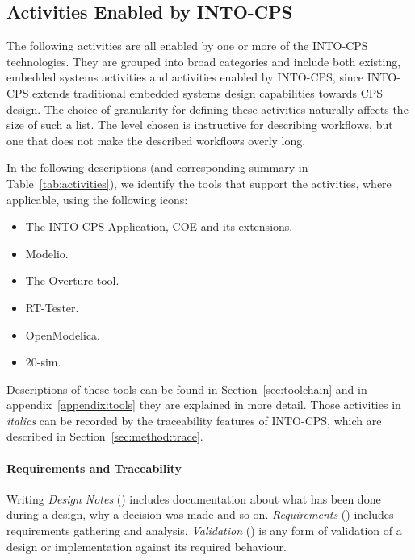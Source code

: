 \subsection{Activities Enabled by INTO-CPS}
\label{sec:method:workflows}
The following activities are all enabled by one or more of the INTO-CPS technologies. They are grouped into broad categories and include both existing, embedded systems activities and activities enabled by INTO-CPS, since INTO-CPS extends traditional embedded systems design capabilities towards CPS design. The choice of granularity for defining these activities naturally affects the size of such a list. The level chosen is instructive for describing workflows, but one that does not make the described workflows overly long.  %

In the following descriptions (and corresponding summary in Table~\ref{tab:activities}), we identify the tools that support the activities, where applicable, using the following icons:

\begin{itemize}[noitemsep]
\item[\INTOCPS] The INTO-CPS Application, COE and its extensions.
\item[\Modelio] Modelio.
\item[\Overture] The Overture tool.
\item[\RTTester] RT-Tester.
\item[\OpenModelica] OpenModelica.
\item[\TwentySim] 20-sim.
\end{itemize}

Descriptions of these tools can be found in Section~\ref{sec:toolchain} and in appendix~\ref{appendix:tools} they are explained in more detail. Those activities in \emph{italics} can be recorded by the traceability features of INTO-CPS, which are described in Section~\ref{sec:method:trace}.

\paragraph{Requirements and Traceability}

Writing \emph{Design Notes} (\INTOCPS) includes documentation about what has been done during a design, why a decision was made and so on. \emph{Requirements} (\Modelio) includes requirements gathering and analysis. \emph{Validation} (\INTOCPS) is any form of validation of a design or implementation against its required behaviour.

